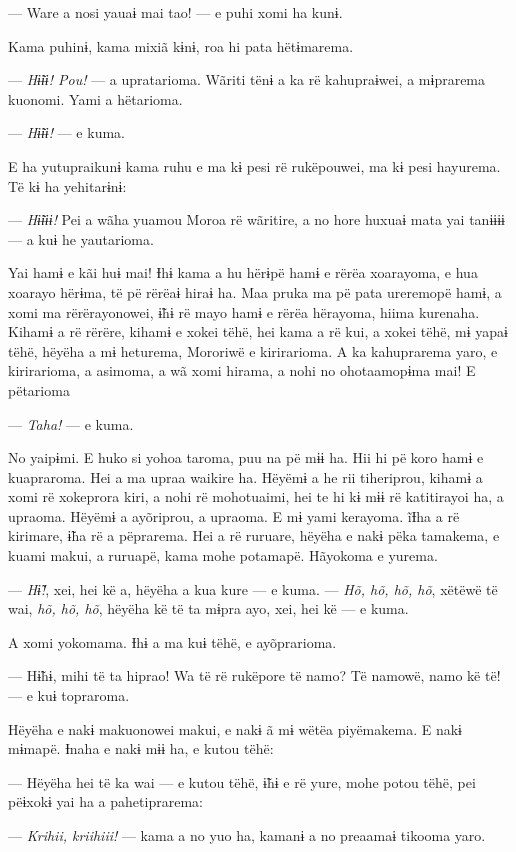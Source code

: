 --- Ware a nosi yauaɨ mai tao! --- e puhi xomi ha kunɨ. 

Kama puhinɨ, kama mixiã kɨnɨ, roa hi pata hëtɨmarema. 

--- \textit{Hɨ̃ɨɨ! Pou!} --- a upratarioma. Wãriti tënɨ a ka rë kahupraɨwei, a
mɨprarema kuonomi. Yami a hëtarioma. 

--- \textit{Hɨ̃ɨɨ!} --- e kuma. 

E ha yutupraikunɨ kama ruhu e ma kɨ pesi rë rukëpouwei, ma kɨ pesi
hayurema. Të kɨ ha yehitarɨnɨ: 

--- \textit{Hɨ̃ɨɨɨ!} Pei a wãha yuamou Moroa rë wãritire, a no hore huxuaɨ mata yai
tanɨɨɨɨ --- a kuɨ he yautarioma. 

Yai hamɨ e kãi huɨ mai! Ɨhɨ kama a hu hërɨpë hamɨ e rërëa xoarayoma, e
hua xoarayo hërɨma, të pë rërëaɨ hiraɨ ha. Maa pruka ma pë pata
ureremopë hamɨ, a xomi ma rërërayonowei, ɨ̃hɨ rë mayo hamɨ e rërëa
hërayoma, hiima kurenaha. Kihamɨ a rë rërëre, kihamɨ e xokei tëhë, hei
kama a rë kui, a xokei tëhë, mɨ yapaɨ tëhë, hëyëha a mɨ heturema,
Mororiwë e kirirarioma. A ka kahuprarema yaro, e kirirarioma, a asimoma,
a wã xomi hirama, a nohi no ohotaamopɨma mai! E pëtarioma 

--- \textit{Taha!} --- e kuma. 

No yaipɨmi. E huko si yohoa taroma, puu na pë mɨɨ ha. Hii hi pë koro
hamɨ e kuapraroma. Hei a ma upraa waikire ha. Hëyëmɨ a he rii
tiheriprou, kihamɨ a xomi rë xokeprora kiri, a nohi rë mohotuaimi, hei
te hi kɨ mɨɨ rë katitirayoi ha, a upraoma. Hëyëmɨ a ayõriprou, a
upraoma. E mɨ yami kerayoma. ĩƗha a rë kirimare, ɨ̃ha rë a pëprarema. Hei
a rë ruruare, hëyëha e nakɨ pëka tamakema, e kuami makui, a ruruapë,
kama mohe potamapë. Hãyokoma e yurema. 

--- \textit{Hɨ̃!}, xei, hei kë a, hëyëha a kua kure --- e kuma. --- \textit{Hõ, hõ, hõ, hõ},
xëtëwë të wai, \textit{hõ, hõ, hõ}, hëyëha kë të ta mɨpra ayo, xei, hei kë --- e
kuma. 

A xomi yokomama. Ɨhɨ a ma kuɨ tëhë, e ayõprarioma. 

--- Hɨ̃hɨ, mihi të ta hiprao! Wa të rë rukëpore të namo? Të namowë, namo kë
të! --- e kuɨ topraroma. 

Hëyëha e nakɨ makuonowei makui, e nakɨ ã mɨ wëtëa piyëmakema. E nakɨ
mɨmapë. Ɨnaha e nakɨ mɨɨ ha, e kutou tëhë: 

--- Hëyëha hei të ka wai --- e kutou tëhë, ɨ̃hɨ e rë yure, mohe potou tëhë,
pei pëɨxokɨ yai ha a pahetiprarema:

--- \textit{Krihii, kriihiii!} --- kama a no yuo ha, kamanɨ a no preaamaɨ tikooma
yaro. 

